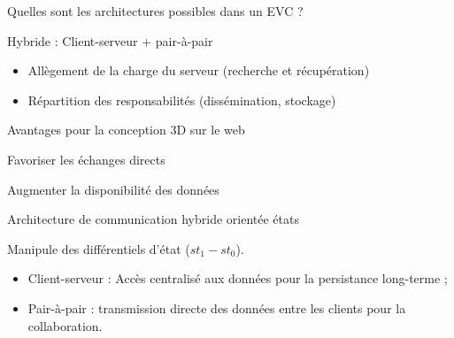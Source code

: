 \begin{frame}{Quelles sont les architectures possibles dans un EVC ?}
\addtocounter{framenumber}{-1}
\begin{minipage}{.5\columnwidth}
	Hybride : Client-serveur + pair-à-pair
	\begin{itemize}
		\item Allègement de la charge du serveur (recherche et récupération)
		\item Répartition des responsabilités (dissémination, stockage)
	\end{itemize}
\end{minipage}\hfill
\begin{minipage}{.5\columnwidth}
		\hspace*{1cm}
\end{minipage}

\separatingline{\columnwidth}
	
\begin{block}{Avantages pour la conception 3D sur le web}

	Favoriser les échanges directs 
	
	Augmenter la disponibilité des données
\end{block}
\end{frame}


\begin{frame}{Architecture de communication hybride orientée états 
\cite{Desprat2015a,Desprat2015b}}
\noindent


	\begin{minipage}{.48\columnwidth}
	\end{minipage}\hfill
	\begin{minipage}{.48\columnwidth}
	
	Manipule des différentiels d'état ($st_1-st_0$). 
	\begin{itemize}
		\item Client-serveur : Accès \alert{centralisé} aux données pour la 
		persistance 
		long-terme ;
		\item Pair-à-pair : \alert{transmission directe} des données entre les 
		clients pour 
		la 
		collaboration.
	\end{itemize}
	
\end{minipage}
\end{frame}

